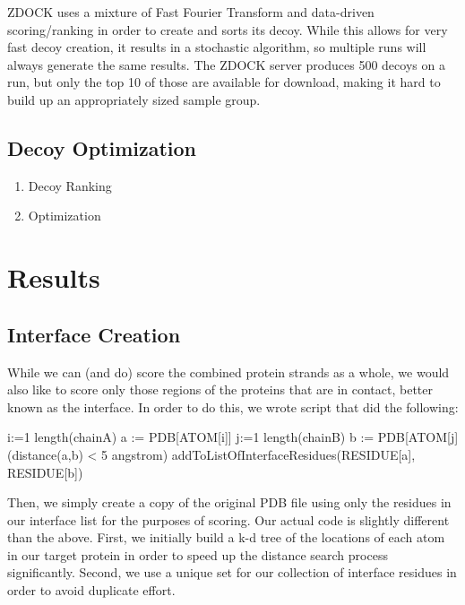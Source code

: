 \documentclass{article}
\begin{document}
ZDOCK uses a mixture of Fast Fourier Transform and data-driven scoring/ranking in order to create and sorts its decoy. While this allows for very fast decoy creation, it results in a stochastic algorithm, so multiple runs will always generate the same results. The ZDOCK server produces 500 decoys on a run, but only the top 10 of those are available for download, making it hard to build up an appropriately sized sample group.

\subsection{Decoy Optimization}

\begin{enumerate}

\item Decoy Ranking

\item Optimization

\end{enumerate}



\section{Results}



\subsection{Interface Creation}

While we can (and do) score the combined protein strands as a whole, we would also like to score only those regions of the proteins that are in contact, better known as the interface.  In order to do this, we wrote script that did the following:\\

\begin{program}
  \FOR i:=1 \TO length(chainA)  \DO
	a := PDB[ATOM[i]]
    \FOR j:=1 \TO length(chainB)  \DO
	b := PDB[ATOM[j]
    \IF (distance(a,b) < 5 angstrom) \DO
addToListOfInterfaceResidues(RESIDUE[a], RESIDUE[b])
    \END
   \END
\END
\end{program}

Then, we simply create a copy of the original PDB file using only the residues in our interface list for the purposes of scoring.  Our actual code is slightly different than the above.  First, we initially build a k-d tree of the locations of each atom in our target protein in order to speed up the distance search process significantly.  Second, we use a unique set for our collection of interface residues in order to avoid duplicate effort.\\
\end{document}
